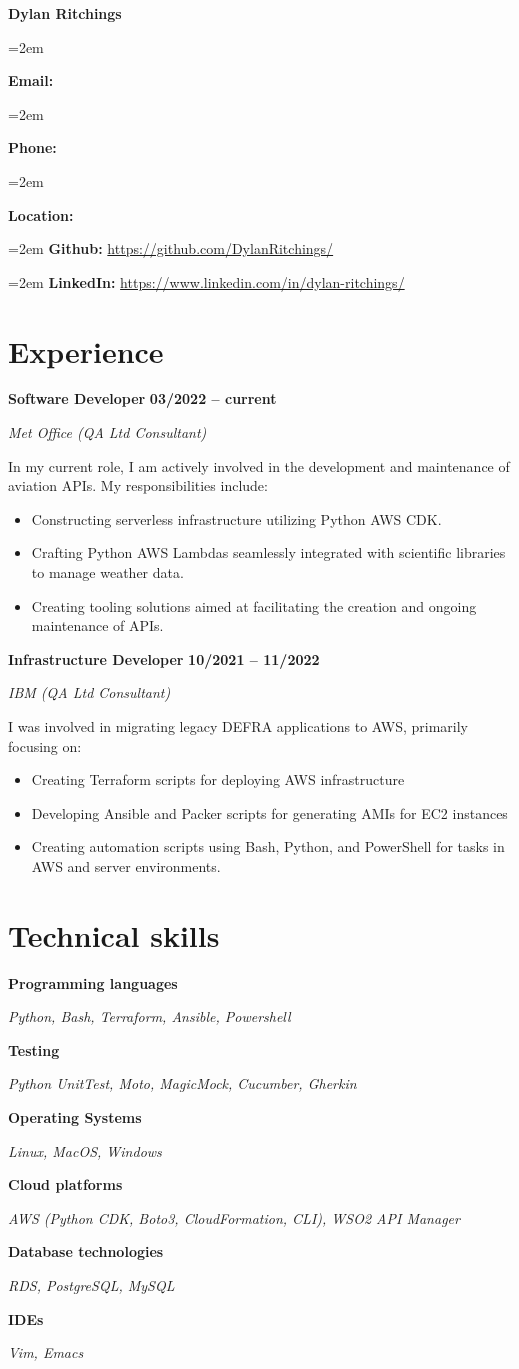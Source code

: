\documentclass[12pt]{article}
\newlength{\spacebox}
\newcommand{\sepspace}{\vspace*{1em}}
\newcommand{\name}[1]{
\Huge 
\begin{center} \textbf{#1} \end{center}\par
\normalsize}
\newcommand{\info}[2]{
  \noindent\hangindent=2em\hangafter=0
  \parbox{\spacebox}{%
    \textbf{#1:}} #2 \par
  } %
\newcommand{\link}[2]{
  \noindent\hangindent=2em\hangafter=0
  \textbf{#1:} \url{#2} \par
  }
\newcommand{\skill}[2]{
\noindent\hangafter=0
\begin{minipage}[t]{0.31\textwidth}
  \textbf{#1} 
  \end{minipage}
  \hfill %
  \begin{minipage}[t]{0.6\textwidth}
      #2
  \end{minipage}
  \par
  \vspace*{0.5em}} %
\newcommand{\work}[4]{
  \noindent  \textbf{#1}
  \hfill 
  {%
  \centering\textbf{#2}} \par
  \noindent \textit{#3} \par
  \vspace*{0.3em}
  \noindent\hangafter=0 \small #4 
\normalsize \par}
\begin{document}
\name{Dylan Ritchings}
\vspace*{-10pt}

\sepspace
\info{Email}{}
\info{Phone}{}
\info{Location}{}

\sepspace
\link{Github}{https://github.com/DylanRitchings/}
\link{LinkedIn}{https://www.linkedin.com/in/dylan-ritchings/}

\section*{Experience}

\work{Software Developer}{03/2022 -- current}{Met Office (QA Ltd Consultant)}
{In my current role, I am actively involved in the development and maintenance of aviation APIs. My responsibilities include:

\begin{itemize}
  \item Constructing serverless infrastructure utilizing Python AWS CDK.
  \item Crafting Python AWS Lambdas seamlessly integrated with scientific libraries to manage weather data.
  \item Creating tooling solutions aimed at facilitating the creation and ongoing maintenance of APIs.
\end{itemize}}

\sepspace

\work{Infrastructure Developer}{10/2021 -- 11/2022}{IBM (QA Ltd Consultant)}
{I was involved in migrating legacy DEFRA applications to AWS, primarily focusing on:
\begin{itemize}
    \item Creating Terraform scripts for deploying AWS infrastructure
    \item Developing Ansible and Packer scripts for generating AMIs for EC2 instances
    \item Creating automation scripts using Bash, Python, and PowerShell for tasks in AWS and server environments.
\end{itemize}}

\section*{Technical skills}

\skill{Programming languages}{\textsl{Python, Bash, Terraform, Ansible, Powershell}}
\skill{Testing}{\textsl {Python UnitTest, Moto, MagicMock, Cucumber, Gherkin}}
\skill{Operating Systems}{\textsl{Linux, MacOS, Windows}}
\skill{Cloud platforms}{\textsl{AWS (Python CDK, Boto3, CloudFormation, CLI), WSO2 API Manager}}
\skill{Database technologies}{\textsl{RDS, PostgreSQL, MySQL}}
\skill{IDEs}{\textsl{Vim, Emacs}}
\end{document}
